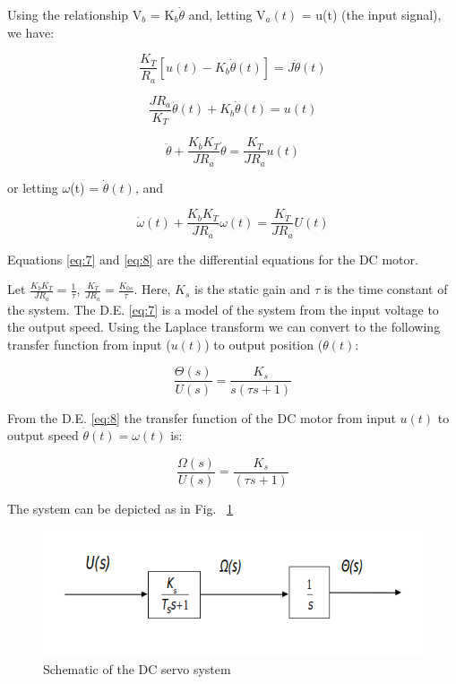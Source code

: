 \documentclass[11pt,a4paper]{article}
\begin{document}
Using the relationship V$_{b}$ = K$_{b}\dot{\theta}$ and, letting V$_{a}(t)$ = u(t) (the input signal), we have:

\begin{equation} \label{eq:5}
\frac{K_{T}}{R_{a}}\left[u(t)-K_{b}\dot{\theta}(t)\right] = J\ddot{\theta}(t)
\end{equation}

\begin{equation} \label{eq:6}
\frac{JR_{a}}{K_{T}}\ddot{\theta}(t)+ K_{b}\dot{\theta}(t) = u(t)
\end{equation}

\begin{equation} \label{eq:7}
\ddot{\theta} + \frac{K_{b}K_{T}}{JR_{a}}\dot{\theta} = \frac{K_{T}}{JR_{a}}u(t)
\end{equation}

or letting $\omega$(t) = $\dot{\theta}(t)$, and 

\begin{equation} \label{eq:8}
\dot{\omega}(t) + \frac{K_{b}K_{T}}{JR_{a}}\omega(t) = \frac{K_{T}}{JR_{a}}U(t)
\end{equation}

Equations \ref{eq:7} and \ref{eq:8} are the differential equations for the DC motor.

Let $\frac{K_{b}K_{T}}{JR_{a}} = \frac{1}{\tau}$, $\frac{K_{T}}{JR_{a}} = \frac{K_{0s}}{\tau}$. Here, $K_{s}$ is the static gain and $\tau$ is the time constant of the system. The D.E. \ref{eq:7} is a model of the system from the input voltage to the output speed. Using the Laplace transform we can convert to the following transfer function from input ($u(t)$) to output position ($\theta (t)$:

\begin{equation} \label{eq:9}
\frac{\Theta(s)}{U(s)} = \frac{K_{s}}{s(\tau s + 1)}
\end{equation}

From the D.E. \ref{eq:8} the transfer function of the DC motor from input $u(t)$ to output speed $\dot{\theta}(t)=\omega(t)$ is:

\begin{equation} \label{eq:10}
\frac{\Omega (s)}{U(s)} = \frac{K_{s}}{(\tau s + 1)}
\end{equation}

The system can be depicted as in Fig. ~\ref{fig:servomeasschem}

\begin{figure}[here]
\includegraphics[width=\textwidth]{imglab/servoschematicnomeasurement.png}
\caption{Schematic of the DC servo system}
\label{fig:servomeasschem}
\end{figure}
\end{document}
